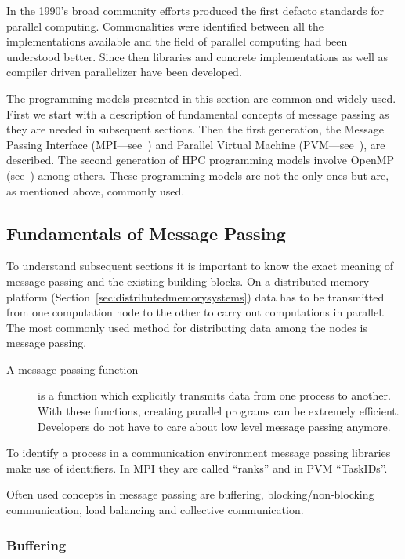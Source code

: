 In the 1990's broad community efforts produced the first defacto
standards for parallel computing. Commonalities were identified
between all the implementations available and the field of parallel
computing had been understood better. Since then libraries and concrete
implementations as well as compiler driven parallelizer have been
developed.


The programming models presented in this section are common and widely
used. First we start with a description of fundamental concepts of
message passing as they are needed in subsequent sections. Then the
first generation, the Message Passing Interface 
(MPI---see~\cite{forum94:MPI}) and Parallel Virtual Machine
(PVM---see~\cite{geist94pvm}),
are described. The second generation of HPC programming
models involve OpenMP (see~\cite{openMP05}) among others. These
programming models are not the only ones 
but are, as mentioned above, commonly used. 

\subsection{Fundamentals of Message Passing}
\label{sec:messagepassing}

To understand subsequent sections it is important to know the exact
meaning of message passing and the existing building blocks.
On a distributed memory platform
(Section~\ref{sec:distributedmemorysystems}) data has to be transmitted
from one computation node to the other to carry out computations in
parallel. The most commonly used method for distributing data among
the nodes is message passing.
  
\begin{description}
\item[A message passing function] is a function which explicitly transmits
  data from one process to another. With these
  functions, creating parallel programs can be extremely
  efficient. Developers do not have to care about low level
  message passing anymore.
\end{description}

To identify a process in a communication environment message passing
libraries make use of identifiers. In MPI they are called ``ranks''
and in PVM ``TaskIDs''.

Often used concepts in message passing are buffering,
blocking/non-blocking communication, load balancing and collective
communication. 

\subsubsection{Buffering}

